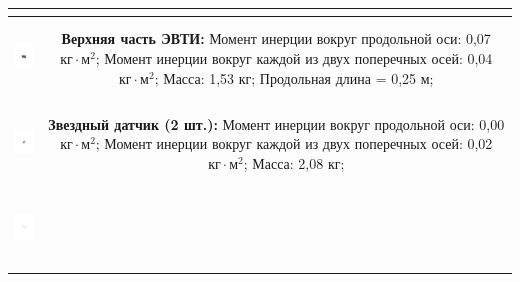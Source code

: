 \begin{table}[h!]
\begin{tabular}{|c|c|}
{                          }                                                                                         \\
        \hline
            \includegraphics[height=20mm, keepaspectratio]{./src/pictures/sattelite_3d_images/top_shell_part}       &
            \shortstack[l]{\textbf{Верхняя часть ЭВТИ:}                                                     \\
                            Момент инерции вокруг продольной оси: 0,07 $\text{кг} \cdot \text{м}^{2}$;                    \\
                            Момент инерции вокруг каждой из двух поперечных  осей: 0,04 $\text{кг} \cdot \text{м}^{2}$;   \\
                            Масса: 1,53 кг;                                                               \\
                            Продольная длина = 0,25 м;
                          }                                                                                         \\
        \hline
            \includegraphics[height=20mm, keepaspectratio]{./src/pictures/sattelite_3d_images/star_sensor}          &
            \shortstack[l]{\textbf{Звездный датчик (2 шт.):}                                                \\
                            Момент инерции вокруг продольной оси: 0,00 $\text{кг} \cdot \text{м}^{2}$;                    \\
                            Момент инерции вокруг каждой из двух поперечных  осей: 0,02 $\text{кг} \cdot \text{м}^{2}$;   \\
                            Масса: 2,08 кг;
                          }                                                                                         \\
        \hline
            \includegraphics[height=20mm, keepaspectratio]{./src/pictures/sattelite_3d_images/sleeve}               &

\end{tabular}
\end{table}
